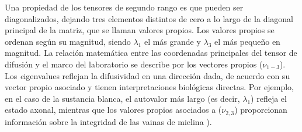 %     

Una propiedad de los tensores de segundo rango es que pueden ser diagonalizados, dejando tres elementos distintos de cero a lo largo de la diagonal principal de la matriz, que se llaman valores propios. Los valores propios se ordenan según su magnitud, siendo $\lambda_{1}$ el más grande y $\lambda_{3}$ el más pequeño en magnitud. La relación matemática entre las coordenadas principales del tensor de difusión y el marco del laboratorio se describe por los vectores propios ($\nu_{1-3}$). Los {\emph eigenvalues} reflejan la difusividad en una dirección dada, de acuerdo con su vector propio asociado y tienen interpretaciones biológicas directas. Por ejemplo, en el caso de la sustancia blanca, el autovalor más largo (es decir, $\lambda_{1}$) refleja el estado axonal, mientras que los valores propios asociados a ($\nu_{2,3}$) proporcionan información sobre la integridad de las vainas de mielina \cite{Song_2003,Concha_2006}).


